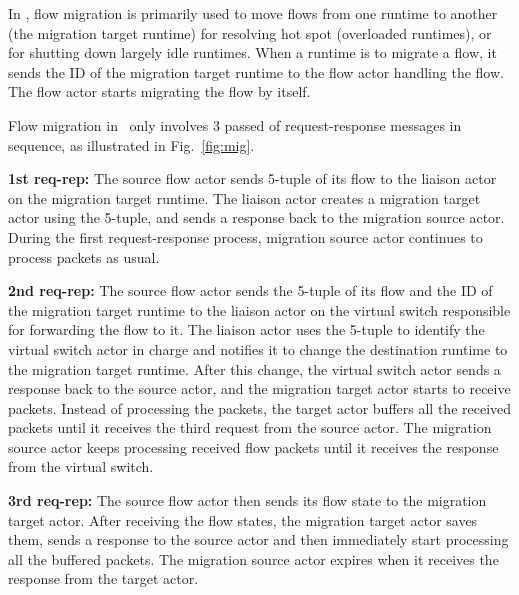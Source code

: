 In \nfactor, flow migration is primarily used to move flows from one runtime to another (the migration target runtime) for resolving hot spot (overloaded runtimes), or for shutting down largely idle runtimes.  When a runtime is to migrate a flow,  %
 it sends the ID of the migration target runtime to the flow actor handling the flow. The flow actor starts migrating the flow by itself. %
 

Flow migration in \nfactor~only involves 3 passed of request-response messages in sequence, as illustrated in Fig.~\ref{fig:mig}.



\textbf{1st req-rep:} The source flow actor sends 5-tuple of its flow to the liaison actor on the migration target runtime. The liaison actor creates a migration target actor using the 5-tuple, and sends a response back to the migration source actor. During the first request-response process, migration source actor continues to process packets as usual.

\textbf{2nd req-rep:} The source flow actor sends the 5-tuple of its flow and the ID of the migration target runtime to the liaison actor on the virtual switch responsible for forwarding the flow to it. The liaison actor uses the 5-tuple to identify the virtual switch actor in charge and notifies it to change the destination runtime to the migration target runtime. After this change, the virtual switch actor sends a response back to the source actor, and the migration target actor starts to receive packets. Instead of processing the packets, the target actor buffers all the received packets until it receives the third request from the source actor. The migration source actor keeps processing received flow packets until it receives the response from the virtual switch.

\textbf{3rd req-rep:} The source flow actor then sends its flow state to the migration target actor. After receiving the flow states, the migration target actor saves them, sends a response to the source actor and then immediately start processing all the buffered packets. The migration source actor expires when it receives the response from the target actor.

